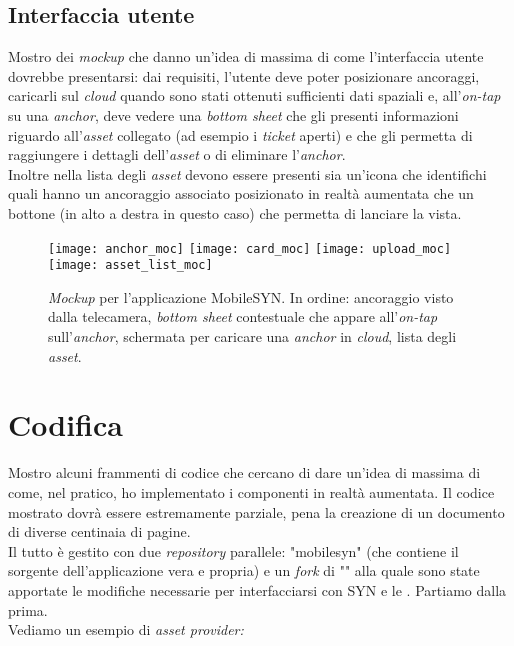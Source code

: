 \subsection{Interfaccia utente}
Mostro dei \textit{mockup} che danno un'idea di massima di come l'interfaccia utente dovrebbe presentarsi: dai requisiti, l'utente deve poter posizionare ancoraggi, caricarli sul \textit{cloud} quando sono stati ottenuti sufficienti dati spaziali e, all'\textit{on-tap} su una \textit{anchor}, deve vedere una \textit{bottom sheet} che gli presenti informazioni riguardo all'\textit{asset} collegato (ad esempio i \textit{ticket} aperti) e che gli permetta di raggiungere i dettagli dell'\textit{asset} o di eliminare l'\textit{anchor}.\\
Inoltre nella lista degli \textit{asset} devono essere presenti sia un'icona che identifichi quali hanno un ancoraggio associato posizionato in realtà aumentata che un bottone (in alto a destra in questo caso) che permetta di lanciare la vista.
\newpage
\begin{figure}[H]
  \centering
  \texttt{[image: anchor\_moc]}\hfill
  \texttt{[image: card\_moc]}\hfill
  \texttt{[image: upload\_moc]}\hfill
  \texttt{[image: asset\_list\_moc]}
  \caption[\textit{App mockup} ]{\textit{Mockup} per l'applicazione MobileSYN. In ordine: ancoraggio visto dalla telecamera, \textit{bottom sheet} contestuale che appare all'\textit{on-tap} sull'\textit{anchor}, schermata per caricare una \textit{anchor} in \textit{cloud}, lista degli \textit{asset}.}
\end{figure}

\section{Codifica}
Mostro alcuni frammenti di codice che cercano di dare un'idea di massima di come, nel pratico, ho implementato i componenti in realtà aumentata. Il codice mostrato dovrà essere estremamente parziale, pena la creazione di un documento di diverse centinaia di pagine.\\
Il tutto è gestito con due \textit{repository} parallele: "mobilesyn" (che contiene il sorgente dell'applicazione vera e propria) e un \textit{fork} di "\aplug{}" alla quale sono state apportate le modifiche necessarie per interfacciarsi con SYN e le \asa{}. Partiamo dalla prima.\\
Vediamo un esempio di \textit{asset provider:}

